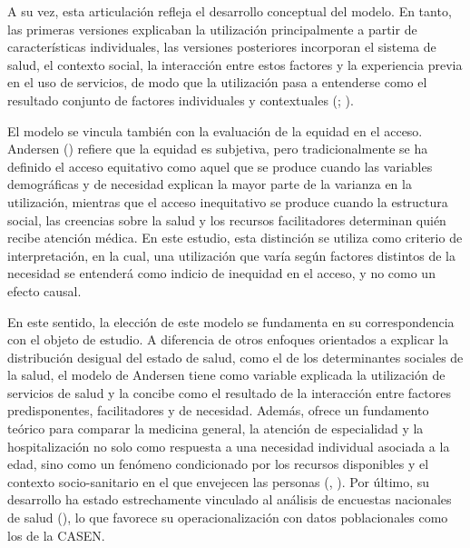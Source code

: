 \documentclass[
  spanish,
  a4paper,
  oneside]{scrbook}
\begin{document}
A su vez, esta articulación refleja el desarrollo conceptual del modelo.
En tanto, las primeras versiones explicaban la utilización
principalmente a partir de características individuales, las versiones
posteriores incorporan el sistema de salud, el contexto social, la
interacción entre estos factores y la experiencia previa en el uso de
servicios, de modo que la utilización pasa a entenderse como el
resultado conjunto de factores individuales y contextuales
(;
).

El modelo se vincula también con la evaluación de la equidad en el
acceso. Andersen () refiere
que la equidad es subjetiva, pero tradicionalmente se ha definido el
acceso equitativo como aquel que se produce cuando las variables
demográficas y de necesidad explican la mayor parte de la varianza en la
utilización, mientras que el acceso inequitativo se produce cuando la
estructura social, las creencias sobre la salud y los recursos
facilitadores determinan quién recibe atención médica. En este estudio,
esta distinción se utiliza como criterio de interpretación, en la cual,
una utilización que varía según factores distintos de la necesidad se
entenderá como indicio de inequidad en el acceso, y no como un efecto
causal.

En este sentido, la elección de este modelo se fundamenta en su
correspondencia con el objeto de estudio. A diferencia de otros enfoques
orientados a explicar la distribución desigual del estado de salud, como
el de los determinantes sociales de la salud, el modelo de Andersen
tiene como variable explicada la utilización de servicios de salud y la
concibe como el resultado de la interacción entre factores
predisponentes, facilitadores y de necesidad. Además, ofrece un
fundamento teórico para comparar la medicina general, la atención de
especialidad y la hospitalización no solo como respuesta a una necesidad
individual asociada a la edad, sino como un fenómeno condicionado por
los recursos disponibles y el contexto socio-sanitario en el que
envejecen las personas
(,
). Por último, su desarrollo
ha estado estrechamente vinculado al análisis de encuestas nacionales de
salud (), lo que
favorece su operacionalización con datos poblacionales como los de la
CASEN.
\end{document}
